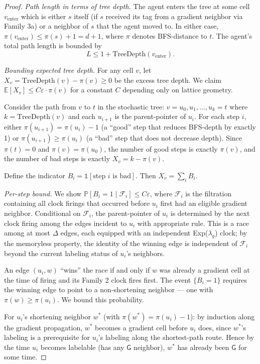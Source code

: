 \documentclass[11pt]{article}
\theoremstyle{plain}
\theoremstyle{definition}
\theoremstyle{remark}
\newcommand{\Pr}{\mathbb{P}}
\begin{document}
\begin{proof}
\emph{Path length in terms of tree depth.} The agent enters the tree at some cell $v_{\text{enter}}$ which is either $s$ itself (if $s$ received its tag from a gradient neighbor via Family 3a) or a neighbor of $s$ that the agent moved to. In either case, $\pi(v_{\text{enter}}) \leq \pi(s) + 1 = d + 1$, where $\pi$ denotes BFS-distance to $t$. The agent's total path length is bounded by
\[
L \leq 1 + \mathrm{TreeDepth}(v_{\text{enter}}).
\]

\emph{Bounding expected tree depth.} For any cell $v$, let $X_v = \mathrm{TreeDepth}(v) - \pi(v) \geq 0$ be the excess tree depth. We claim $\mathbb{E}[X_v] \leq C \varepsilon \cdot \pi(v)$ for a constant $C$ depending only on lattice geometry.

Consider the path from $v$ to $t$ in the stochastic tree: $v = u_0, u_1, \ldots, u_k = t$ where $k = \mathrm{TreeDepth}(v)$ and each $u_{i+1}$ is the parent-pointer of $u_i$. For each step $i$, either $\pi(u_{i+1}) = \pi(u_i) - 1$ (a ``good'' step that reduces BFS-depth by exactly 1) or $\pi(u_{i+1}) \geq \pi(u_i)$ (a ``bad'' step that does not decrease depth). Since $\pi(t) = 0$ and $\pi(v) = \pi(u_0)$, the number of good steps is exactly $\pi(v)$, and the number of bad steps is exactly $X_v = k - \pi(v)$.

Define the indicator $B_i = \mathbb{1}[\text{step } i \text{ is bad}]$. Then $X_v = \sum_i B_i$.

\emph{Per-step bound.} We show $\Pr[B_i = 1 \mid \mathcal{F}_{i}] \leq C\varepsilon$, where $\mathcal{F}_i$ is the filtration containing all clock firings that occurred before $u_i$ first had an eligible gradient neighbor. Conditional on $\mathcal{F}_i$, the parent-pointer of $u_i$ is determined by the next clock firing among the edges incident to $u_i$ with appropriate rule. This is a race among at most $\Delta$ edges, each equipped with an independent Exp($\lambda_g$) clock; by the memoryless property, the identity of the winning edge is independent of $\mathcal{F}_i$ beyond the current labeling status of $u_i$'s neighbors.

An edge $(u_i, w)$ ``wins'' the race if and only if $w$ was already a gradient cell at the time of firing and its Family 2 clock fires first. The event $\{B_i = 1\}$ requires the winning edge to point to a non-shortening neighbor --- one with $\pi(w) \geq \pi(u_i)$. We bound this probability.

For $u_i$'s shortening neighbor $w^*$ (with $\pi(w^*) = \pi(u_i) - 1$): by induction along the gradient propagation, $w^*$ becomes a gradient cell before $u_i$ does, since $w^*$'s labeling is a prerequisite for $u_i$'s labeling along the shortest-path route. Hence by the time $u_i$ becomes labelable (has any $\mathsf{G}$ neighbor), $w^*$ has already been $\mathsf{G}$ for some time.


\end{proof}
\end{document}
